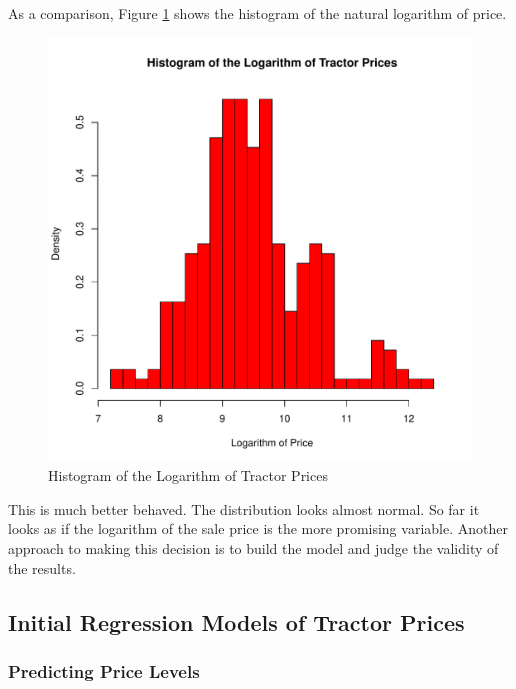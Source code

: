 \documentclass[11pt]{paper}
\begin{document}
\pagebreak
As a comparison, Figure \ref{fig:hist_log_price} shows the histogram of the natural logarithm of
price.

\begin{figure}[h!]
  \centering
  \includegraphics[scale = 0.5, keepaspectratio=true]{../Figures/hist_log_price}
  \caption{Histogram of the Logarithm of Tractor Prices} \label{fig:hist_log_price}
\end{figure}

This is much better behaved. The distribution looks almost normal. 
So far it looks as if the logarithm of the sale price
is the more promising variable.
Another approach to making this decision is
to build the model and judge the validity of the results.





\pagebreak
\subsection{Initial Regression Models of Tractor Prices}

\subsubsection{Predicting Price Levels}
\end{document}
